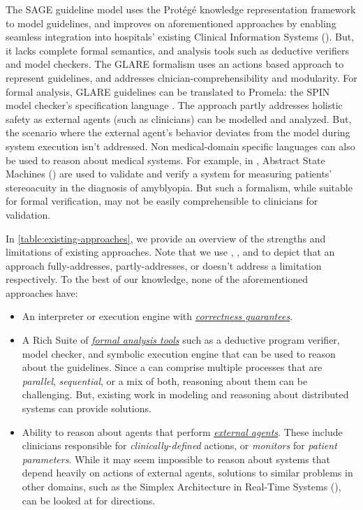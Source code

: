 The SAGE guideline model \cite{TuSAGE04} uses the Prot\'eg\'e knowledge
representation framework \cite{NoyAMIA03} to model guidelines,
and improves on aforementioned approaches by
enabling seamless integration into hospitals' existing Clinical Information Systems
(\CISs). But, it lacks complete formal semantics, and analysis tools
such as deductive verifiers and model checkers.
The GLARE formalism \cite{TerenzianiBook04} uses an actions based approach
to represent guidelines, and addresses clnician-comprehensibility and
modularity. For formal analysis, GLARE guidelines can be translated to
Promela: the SPIN model checker's specification language \cite{GiordanoAMIA06}.
The approach partly addresses holistic safety as
external agents (such as clinicians) can be modelled and analyzed.
But, the scenario where the external agent's behavior
deviates from the model during system execution isn't addressed.
Non medical-domain specific languages can also be used to reason about
medical systems. For example, in \cite{ArcainiMEMCODE15}, Abstract State
Machines (\ASMs) are used to validate and verify a system for measuring
patients' stereoacuity in the diagnosis of amyblyopia. But such a
formalism, while suitable for formal verification, may
not be easily comprehensible to clinicians for validation.

In \tablename{} \ref{table:existing-approaches}, we provide an overview of
the strengths and limitations of existing approaches. Note that we use
\greencheck{}, \cancelcheck{}, and \redcross{} to depict that an approach
fully-addresses, partly-addresses, or doesn't address a limitation respectively.
To the best of our knowledge,
none of the aforementioned approaches have:
\begin{itemize}[leftmargin=*]
  \setlength\itemsep{0em}
  \item An interpreter or execution engine with \emph{\underline{correctness guarantees}}.
  \item A Rich Suite of \emph{\underline{formal analysis tools}} such as a deductive program
    verifier, model checker, and symbolic execution engine that can be used to
    reason about the guidelines. Since a \CIG{} can comprise multiple
    processes that are \emph{parallel}, \emph{sequential}, or a mix of both,
    reasoning about them can be challenging. But, existing work in modeling
    and reasoning about distributed systems can provide solutions.
  \item Ability to reason about agents that perform \emph{\underline{external
    agents}}. These include clinicians responsible for \emph{clinically-defined}
    actions, or \emph{monitors} for \emph{patient parameters}. While it may seem
    impossible to reason about systems that depend heavily on actions of
    external agents, solutions to similar problems in other domains, such as
    the Simplex Architecture \cite{BakRTAS09} in Real-Time Systems (\RTSs), can be looked at for directions.
\end{itemize}

